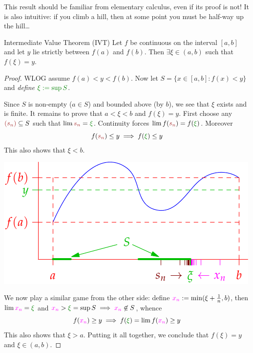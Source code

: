 This result should be familiar from elementary calculus, even if its proof is not! It is also intuitive: if you climb a hill, then at some point you must be half-way up the hill\ldots


\begin{thm}{Intermediate Value Theorem (IVT)}{}
	Let $f$ be continuous on the interval $[a,b]$ and let $y$ lie strictly between $f(a)$ and $f(b)$. Then $\exists\xi\in(a,b)$ such that $f(\xi)=y$.
\end{thm}



\begin{proof}
	WLOG assume $f(a)<y<f(b)$. Now let $S=\{x\in[a,b]:f(x)<y\}$ and \emph{define} $\textcolor{Green}{\xi:=\sup S}$.\par
	\begin{minipage}[t]{0.51\linewidth}\vspace{0pt}
		Since $S$ is non-empty ($a\in S$) and bounded above (by $b$), we see that $\xi$ exists and is finite. It remains to prove that $a<\xi<b$ and $f(\xi)=y$.\smallbreak
		First choose any $\textcolor{Brown}{(s_n)}\subseteq S$ such that\footnotemark{} $\lim\textcolor{Brown}{s_n}=\textcolor{Green}{\xi}$.
		Continuity forces $\lim f(\textcolor{Brown}{s_n})=f(\textcolor{Green}{\xi})$. Moreover
		\[
			f(\textcolor{Brown}{s_n})\le y\implies f(\textcolor{Green}{\xi})\le y
		\]
		This also shows that $\xi<b$.
	\end{minipage}
	\hfill
	\begin{minipage}[t]{0.48\linewidth}\vspace{0pt}
		\hfill\includegraphics[scale=0.95]{intval}
	\end{minipage}
	\smallbreak
	We now play a similar game from the other side: define $\textcolor{Magenta}{x_n}:=\min(\xi+\frac 1n,b)$, then $\lim\textcolor{Magenta}{x_n}=\textcolor{Green}{\xi}$ and $\textcolor{Magenta}{x_n}>\textcolor{Green}{\xi}=\sup S\implies \textcolor{Magenta}{x_n}\not\in S$, whence
  \[
  	f(\textcolor{Magenta}{x_n})\ge y\implies f(\textcolor{Green}{\xi})=\lim f(\textcolor{Magenta}{x_n})\ge y
  \]
  This also shows that $\xi>a$. Putting it all together, we conclude that $f(\xi)=y$ and $\xi\in(a,b)$.
\end{proof}

